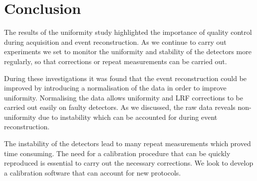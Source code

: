 \section{Conclusion}
The results of the uniformity study highlighted the importance of quality control during acquisition and event reconstruction. As we continue to carry out experiments we set to monitor the uniformity and stability of the detectors more regularly, so that corrections or repeat measurements can be carried out.

During these investigations it was found that the event reconstruction could be improved by introducing a normalisation of the data in order to improve uniformity. Normalising the data allows uniformity and \acrshort{LRF} corrections to be carried out easily on faulty detectors. As we discussed, the raw data reveals  non-uniformity due to instability which can be accounted for during event reconstruction. 

The instability of the detectors lead to many repeat measurements which proved time consuming. The need for a calibration procedure that can be quickly reproduced is essential to carry out the necessary corrections. We look to develop a calibration software that can account for new protocols. 
